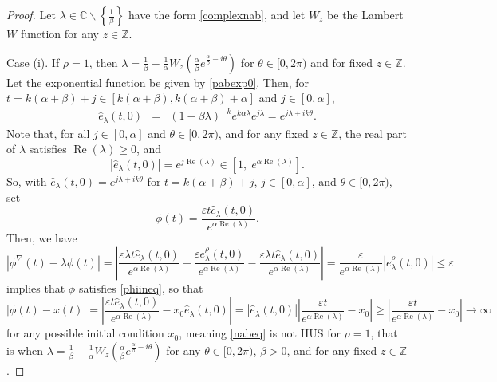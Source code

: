 \documentclass[12pt,reqno]{amsart}
\theoremstyle{plain}
\theoremstyle{definition}
\newcommand{\Z}{\ensuremath{\mathbb{Z}}}
\newcommand{\C}{\ensuremath{\mathbb{C}}}
\numberwithin{equation}{section}
\numberwithin{theorem}{section}
\begin{document}
\begin{proof}
Let $\lambda\in\C\backslash\left\{\frac{1}{\beta}\right\}$ have the form \eqref{complexnab}, and let $W_z$ be the Lambert $W$ function for any $z\in\Z$. 

Case (i). If $\rho=1$, then $\lambda=\frac{1}{\beta}-\frac{1}{\alpha}W_z\left(\frac{\alpha}{\beta}e^{\frac{\alpha}{\beta}-i\theta}\right)$ for $\theta\in[0,2\pi)$ and for fixed $z\in\Z$. Let the exponential function be given by \eqref{pabexp0}. Then, for $t=k(\alpha+\beta)+j\in[k(\alpha+\beta),k(\alpha+\beta)+\alpha]$ and $j\in[0,\alpha]$, 
\begin{eqnarray*}
 \widehat{e}_{\lambda}(t,0) &=& (1-\beta\lambda)^{-k}e^{k\alpha\lambda} e^{j\lambda} = e^{j\lambda+ik\theta}.
\end{eqnarray*}
Note that, for all $j\in[0,\alpha]$ and $\theta\in[0,2\pi)$, and for any fixed $z\in\Z$, the real part of $\lambda$ satisfies $\operatorname{Re}(\lambda)\ge 0$, and
\[ |\widehat{e}_{\lambda}(t,0) | = e^{j\operatorname{Re}(\lambda)}\in\left[1,\;e^{\alpha\operatorname{Re}(\lambda)}\right]. \]
So, with $\widehat{e}_{\lambda}(t,0)=e^{j\lambda+ik\theta}$ for $t=k(\alpha+\beta)+j$, $j\in[0,\alpha]$, and $\theta\in[0,2\pi)$, set 
\[ \phi(t)=\frac{\varepsilon t\widehat{e}_{\lambda}(t,0)}{e^{\alpha\operatorname{Re}(\lambda)}}. \]
Then, we have
$$ |\phi^{\nabla}(t)-\lambda \phi(t)| = \left|\frac{\varepsilon\lambda t\widehat{e}_{\lambda}(t,0)}{e^{\alpha\operatorname{Re}(\lambda)}}+\frac{\varepsilon e^{\rho}_{\lambda}(t,0)}{e^{\alpha\operatorname{Re}(\lambda)}}-\frac{\varepsilon\lambda t\widehat{e}_{\lambda}(t,0)}{e^{\alpha\operatorname{Re}(\lambda)}}\right| = \frac{\varepsilon}{e^{\alpha\operatorname{Re}(\lambda)}}|e^{\rho}_{\lambda}(t,0)|\le \varepsilon $$
implies that $\phi$ satisfies \eqref{phiineq}, so that
$$ |\phi(t)-x(t)| = \left|\frac{\varepsilon t\widehat{e}_{\lambda}(t,0)}{e^{\alpha\operatorname{Re}(\lambda)}}-x_0\widehat{e}_{\lambda}(t,0)\right| = |\widehat{e}_{\lambda}(t,0)|\left|\frac{\varepsilon t}{e^{\alpha\operatorname{Re}(\lambda)}} - x_0\right|\ge \left|\frac{\varepsilon t}{e^{\alpha\operatorname{Re}(\lambda)}} - x_0\right| \rightarrow\infty $$
for any possible initial condition $x_0$, meaning \eqref{nabeq} is not HUS for $\rho=1$, that is when $\lambda=\frac{1}{\beta}-\frac{1}{\alpha}W_z\left(\frac{\alpha}{\beta}e^{\frac{\alpha}{\beta}-i\theta}\right)$ for any $\theta\in[0,2\pi)$, $\beta>0$, and for any fixed $z\in\Z$.


\end{proof}
\end{document}
